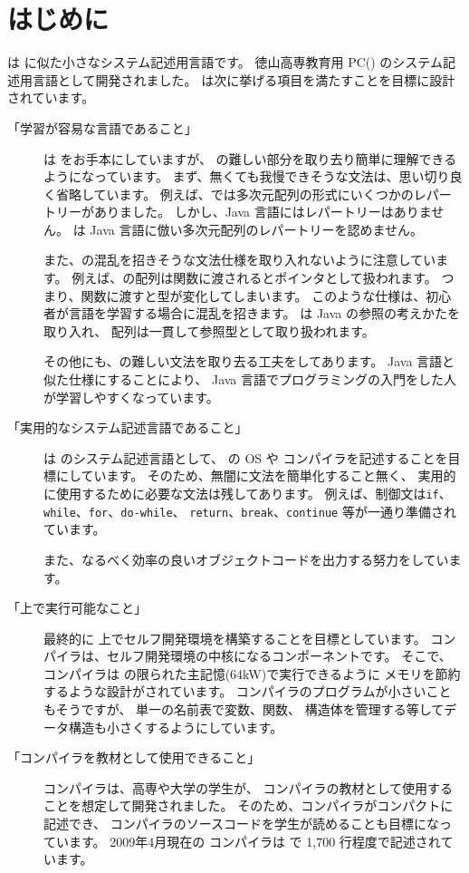 % 
%
\chapter{はじめに}

\cmml は \cl に似た小さなシステム記述用言語です。
徳山高専教育用 PC(\tac) のシステム記述用言語として開発されました。
\cmml は次に挙げる項目を満たすことを目標に設計されています。

\begin{description}
\item[「学習が容易な言語であること」]
\cmml は \cl をお手本にしていますが、
\cl の難しい部分を取り去り簡単に理解できるようになっています。
まず、無くても我慢できそうな文法は、思い切り良く省略しています。
例えば、\cl では多次元配列の形式にいくつかのレパートリーがありました。
しかし、Java 言語にはレパートリーはありません。
\cmml は Java 言語に倣い多次元配列のレパートリーを認めません。

また、\cl の混乱を招きそうな文法仕様を取り入れないように注意しています。
例えば、\cl の配列は関数に渡されるとポインタとして扱われます。
つまり、関数に渡すと型が変化してしまいます。
このような仕様は、初心者が言語を学習する場合に混乱を招きます。
\cmml は Java の参照の考えかたを取り入れ、
配列は一貫して参照型として取り扱われます。

その他にも、\cl の難しい文法を取り去る工夫をしてあります。
Java 言語と似た仕様にすることにより、
Java 言語でプログラミングの入門をした人が学習しやすくなっています。

\item[「実用的なシステム記述言語であること」]
\cmml は \tac のシステム記述言語として、
\tac の OS や \cmm コンパイラを記述することを目標にしています。
そのため、無闇に文法を簡単化すること無く、
実用的に使用するために必要な文法は残してあります。
例えば、制御文は{\tt if}、{\tt while}、{\tt for}、{\tt do-while}、
{\tt return}、{\tt break}、{\tt continue} 等が一通り準備されています。

また、なるべく効率の良いオブジェクトコードを出力する努力をしています。

\item[「\tac 上で実行可能なこと」]
最終的に \tac 上でセルフ開発環境を構築することを目標としています。
\cmm コンパイラは、セルフ開発環境の中核になるコンポーネントです。
そこで、\cmm コンパイラは \tac の限られた主記憶(64kW)で実行できるように
メモリを節約するような設計がされています。
コンパイラのプログラムが小さいこともそうですが、
単一の名前表で変数、関数、
構造体を管理する等してデータ構造も小さくするようにしています。

\item[「コンパイラを教材として使用できること」]
\cmm コンパイラは、高専や大学の学生が、
コンパイラの教材として使用することを想定して開発されました。
そのため、コンパイラがコンパクトに記述でき、
コンパイラのソースコードを学生が読めることも目標になっています。
2009年4月現在の \cmm コンパイラは \cl で 1,700 行程度で記述されています。

\end{description}
